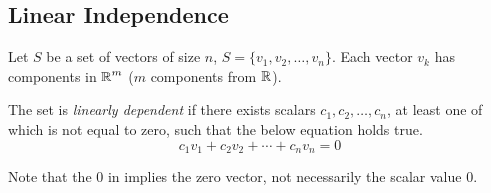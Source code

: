 \subsection{Linear Independence}\label{subsec:Linear_Independence}
\begin{theorem}\label{thm:Linearly_Dependent}
  Let $S$ be a set of vectors of size $n$, $S = \lbrace v_{1}, v_{2}, \ldots, v_{n} \rbrace$.
  Each vector $v_{k}$ has components in $\operatorname{\mathbb{R}}^{m}$ ($m$ components from $\operatorname{\mathbb{R}}$).

  The set is \emph{linearly dependent} if there exists scalars $c_{1}, c_{2}, \ldots, c_{n}$, at least one of which is not equal to zero, such that the below equation holds true.
  \begin{equation}\label{eq:Linearly_Dependent}
    c_{1}v_{1} + c_{2}v_{2} + \cdots + c_{n}v_{n} = 0
  \end{equation}

  \begin{remark*}
    Note that the $0$ in  implies the zero vector, not necessarily the scalar value $0$.
  \end{remark*}
\end{theorem}

